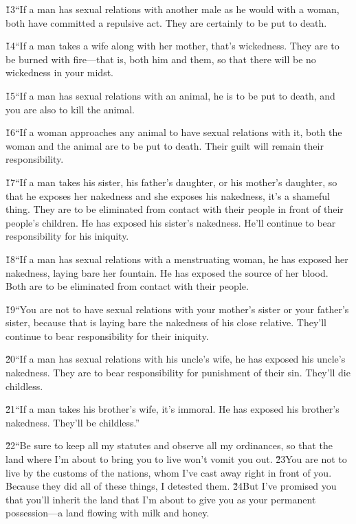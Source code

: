 \v{13}``If a man has sexual relations with another male as he would with a woman, both have committed a repulsive act. They are certainly to be put to death.

\v{14}``If a man takes a wife along with her mother, that's wickedness. They are to be burned with fire---that is, both him and them, so that there will be no wickedness in your midst.

\v{15}``If a man has sexual relations with an animal, he is to be put to death, and you are also to kill the animal.

\v{16}``If a woman approaches any animal to have sexual relations with it, both the woman and the animal are to be put to death. Their guilt will remain their responsibility.

\v{17}``If a man takes his sister, his father's daughter, or his mother's daughter, so that he exposes her nakedness and she exposes his nakedness, it's a shameful thing. They are to be eliminated from contact with their people in front of their people's children. He has exposed his sister's nakedness. He'll continue to bear responsibility for his iniquity.

\v{18}``If a man has sexual relations with a menstruating woman, he has exposed her nakedness, laying bare her fountain. He has exposed the source of her blood. Both are to be eliminated from contact with their people.

\v{19}``You are not to have sexual relations with your mother's sister or your father's sister, because that is laying bare the nakedness of his close relative. They'll continue to bear responsibility for their iniquity.

\v{20}``If a man has sexual relations with his uncle's wife, he has exposed his uncle's nakedness. They are to bear responsibility for punishment of their sin. They'll die childless.

\v{21}``If a man takes his brother's wife, it's immoral. He has exposed his brother's nakedness. They'll be childless.''

\v{22}``Be sure to keep all my statutes and observe all my ordinances, so that the land where I'm about to bring you to live won't vomit you out. \v{23}You are not to live by the customs of the nations, whom I've cast away right in front of you. Because they did all of these things, I detested them. \v{24}But I've promised you that you'll inherit the land that I'm about to give you as your permanent possession---a land flowing with milk and honey.

